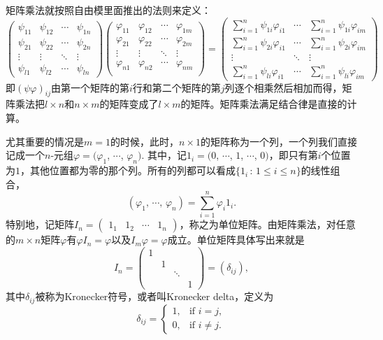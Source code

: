 矩阵乘法就按照自由模里面推出的法则来定义：
\begin{equation}
\begin{pmatrix}
	\psi_{11} & \psi_{12} & \cdots & \psi_{1n}\\
	\psi_{21} & \psi_{22} & \cdots & \psi_{2n}\\
	\vdots & \vdots & \ddots & \vdots \\
	\psi_{l1} & \psi_{l2} & \cdots & \psi_{ln}
\end{pmatrix}
\begin{pmatrix}
	\varphi_{11} & \varphi_{12} & \cdots & \varphi_{1m}\\
	\varphi_{21} & \varphi_{22} & \cdots & \varphi_{2m}\\
	\vdots & \vdots & \ddots & \vdots \\
	\varphi_{n1} & \varphi_{n2} & \cdots & \varphi_{nm}\\
\end{pmatrix}
=
\begin{pmatrix}
	\sum_{i=1}^n \psi_{1i}\varphi_{i1} & \cdots & \sum_{i=1}^n \psi_{1i}\varphi_{im}\\
	\sum_{i=1}^n \psi_{2i}\varphi_{i1} & \cdots & \sum_{i=1}^n \psi_{2i}\varphi_{im}\\
	\vdots & \ddots & \vdots \\
	\sum_{i=1}^n \psi_{li}\varphi_{i1} & \cdots & \sum_{i=1}^n \psi_{li}\varphi_{im}
\end{pmatrix}
\end{equation}
即$(\psi\varphi)_{ij}$由第一个矩阵的第$i$行和第二个矩阵的第$j$列逐个相乘然后相加而得，矩阵乘法把$l\times n$和$n \times m$的矩阵变成了$l \times m$的矩阵。矩阵乘法满足结合律是直接的计算。

尤其重要的情况是$m=1$的时候，此时，$n\times 1$的矩阵称为一个列，一个列我们直接记成一个$n$-元组$\varphi=(\varphi_1$, $\cdots$, $\varphi_n)$. 其中，记$1_i=(0$, $\cdots$, $1$, $\cdots$, $0)$，即只有第$i$个位置为$1$，其他位置都为零的那个列。所有的列都可以看成$\{1_i\,:\, 1\leq i \leq n\}$的线性组合，
\[
	(\varphi_1,\,\cdots\!,\,\varphi_n)=\sum_{i=1}^n\varphi_i1_i.
\]
特别地，记矩阵$I_n=\begin{pmatrix}1_{1} & 1_{2} & \cdots & 1_{n}\end{pmatrix}$，称之为单位矩阵。由矩阵乘法，对任意的$m\times n$矩阵$\varphi$有$\varphi I_n=\varphi$以及$I_m\varphi =\varphi$成立。单位矩阵具体写出来就是
\[
	I_n=
		\begin{pmatrix}
			1 & & &\\
			& 1 & &\\
			& & \ddots &\\
			& & & 1
		\end{pmatrix}
	=(\delta_{ij}),
\]
其中$\delta_{ij}$被称为Kronecker符号，或者叫Kronecker delta，定义为
\[
	\delta_{{ij}}=
	\begin{cases}
	1,&\text{if } i=j,\\
	0,&\text{if } i\neq j.
	\end{cases}
\]


